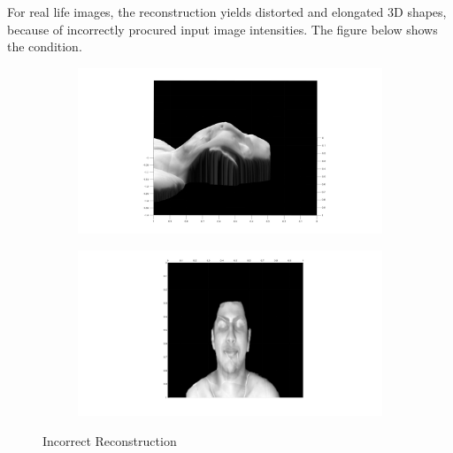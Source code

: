 \documentclass{article}[11pt]
\begin{document}
\pagebreak
\noindent
For real life images, the reconstruction yields distorted and elongated 3D shapes, because of incorrectly procured input image intensities. The figure below shows the condition.
\begin{figure}[h!]
	\begin{subfigure}{0.5\textwidth}
		\centering
		\includegraphics[scale = 0.1]{sanath1.jpg}
	\end{subfigure}
	\begin{subfigure}{0.5\textwidth}
		\centering
		\includegraphics[scale = 0.1]{sanath2.jpg}
	\end{subfigure}
	\caption{Incorrect Reconstruction}
\end{figure}
\nocite{*}


\end{document}
